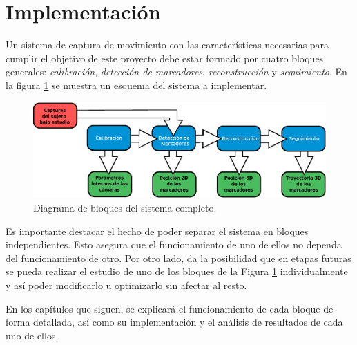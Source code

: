 \section{Implementación}\label{implementacion}

Un sistema de captura de movimiento con las características necesarias para cumplir el objetivo de este proyecto debe estar formado por cuatro bloques generales: \emph{calibración}, \emph{detección de marcadores}, \emph{reconstrucción} y \emph{seguimiento}. En la figura \ref{bloquesSist} se muestra un esquema del sistema a implementar.

\begin{figure}[ht!]
\centering
\hspace{-0.5cm}
\includegraphics[scale=0.5]{imagenes/Sistema_completo/Diagrama_de_bloques.eps}
\caption{Diagrama de bloques del sistema completo.}
\label{bloquesSist}
\end{figure}

Es importante destacar el hecho de poder separar el sistema en bloques independientes. Esto asegura que el funcionamiento de uno de ellos no dependa del funcionamiento de otro. Por otro lado, da la posibilidad que en etapas futuras se pueda realizar el estudio de uno de los bloques de la Figura \ref{bloquesSist} individualmente y así poder modificarlo u optimizarlo sin afectar al resto.

En los capítulos que siguen, se explicará el funcionamiento de cada bloque de forma detallada, así como su implementación y el análisis de resultados de cada uno de ellos.